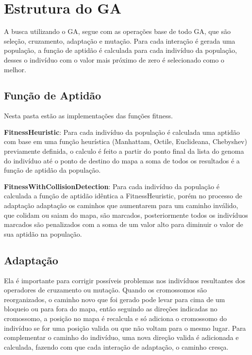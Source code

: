 \section{Estrutura do GA}

A busca utilizando o GA, segue com as operações base de todo GA, que são seleção, cruzamento, adaptação e mutação. 
Para cada interação é gerada uma população, a função de aptidão é calculada para cada indivíduo da população, 
desses o indivíduo com o valor mais próximo de zero é selecionado como o melhor.

\subsection{Função de Aptidão}

Nesta pasta estão as implementações das funções fitness.

\textbf{FitnessHeuristic}: Para cada indivíduo da população é calculada uma aptidão com base em uma função heurística (Manhattam, Octile, Euclideana, Chebyshev)
previamente definida, o calculo é feito a partir do ponto final da lista do genoma do indivíduo até o ponto de destino do mapa
a soma de todos os resultados é a função de aptidão da população.

\textbf{FitnessWithCollisionDetection}: Para cada indivíduo da população é calculada a função de aptidão idêntica a FitnessHeuristic, porém no processo de adaptação adaptação os caminhos que aumentarem para um caminho inválido, que colidam ou saiam do mapa, são marcados,
posteriormente todos os indivíduos marcados são penalizados com a  soma de  um valor alto para diminuir o valor de sua aptidão na população.

\subsection{Adaptação}

Ela é importante para corrigir possíveis problemas nos indivíduos resultantes dos operadores de cruzamento ou mutação. Quando os cromossomos são reorganizados, 
o caminho novo que foi gerado pode levar para cima de um bloqueio ou para fora do mapa, então seguindo as direções indicadas no cromossomo, 
a posição no mapa é recalcula e só adiciona o cromossomo do indivíduo se for uma posição valida ou que não voltam para o mesmo lugar.
Para complementar o caminho do indivíduo, uma nova direção valida é adicionada e calculada, fazendo com que cada interação de adaptação, o caminho cresça.

